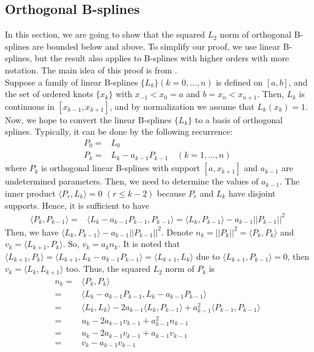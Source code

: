     \newpage
    \subsection{Orthogonal B-splines}\label{orthogonal_b_splines}
        In this section, we are going to show that the squared $L_2$ norm of orthogonal B-splines are bounded below and above. To simplify our proof, we use linear B-splines, but the result also applies to B-splines with higher orders with more notation. The main idea of this proof is from \cite{Mason_1993}.\\

        Suppose a family of linear B-splines $\{L_k\} (k=0,\ldots,n)$ is defined on $[a,b]$, and the set of ordered knots $\{x_k\}$ with $x_{-1}<x_0=a$ and $b=x_n<x_{n+1}$. Then, $L_k$ is continuous in $[x_{k-1},x_{k+1}]$, and by normalization we assume that $L_k(x_k)=1$. Now, we hope to convert the linear B-splines $\{L_k\}$ to a basis of orthogonal splines. Typically, it can be done by the following recurrence:
        \begin{align*}
            P_0=&L_0\\
            P_k=&L_k-a_{k-1}P_{k-1} \quad (k=1,\ldots,n)
        \end{align*}
        where $P_k$ is orthogonal linear B-splines with support $[a,x_{k+1}]$ and $a_{k-1}$ are undetermined parameters. Then, we need to determine the values of $a_{k-1}$. The inner product $\langle P_r,L_k\rangle=0$ $(r \le k-2)$ because $P_r$ and $L_k$ have disjoint supports. Hence, it is sufficient to have
        \begin{align*}
            \langle P_k,P_{k-1}\rangle=& \langle L_k-a_{k-1}P_{k-1}, P_{k-1}\rangle
            = \langle L_k,P_{k-1}\rangle-a_{k-1}||P_{k-1}||^2
        \end{align*}
        Then, we have $\langle L_k,P_{k-1}\rangle-a_{k-1}||P_{k-1}||^2$. Denote $n_k=||P_k||^2=\langle P_k,P_k\rangle$ and $v_k=\langle L_{k+1}, P_k\rangle$. So, $v_k=a_kn_k$. It is noted that $\langle L_{k+1}, P_k\rangle=\langle L_{k+1}, L_k-a_{k-1}P_{k-1}\rangle=\langle L_{k+1},L_k\rangle$ due to $\langle L_{k+1},P_{k-1}\rangle=0$, then $v_k=\langle L_k,L_{k+1}\rangle$ too. Thus, the squared $L_2$ norm of $P_k$ is 
        \begin{align*}
            n_k=&\langle P_k,P_k\rangle\\
            =&\langle L_k-a_{k-1}P_{k-1},L_k-a_{k-1}P_{k-1}\rangle\\
            =&\langle L_k,L_k\rangle-2a_{k-1}\langle L_k,P_{k-1}\rangle+a_{k-1}^2\langle P_{k-1},P_{k-1}\rangle\\
            =&u_k-2a_{k-1}v_{k-1}+a_{k-1}^2n_{k-1}\\
            =&u_k-2a_{k-1}v_{k-1}+a_{k-1}v_{k-1}\\
            =&v_k-a_{k-1}v_{k-1}
        \end{align*}

